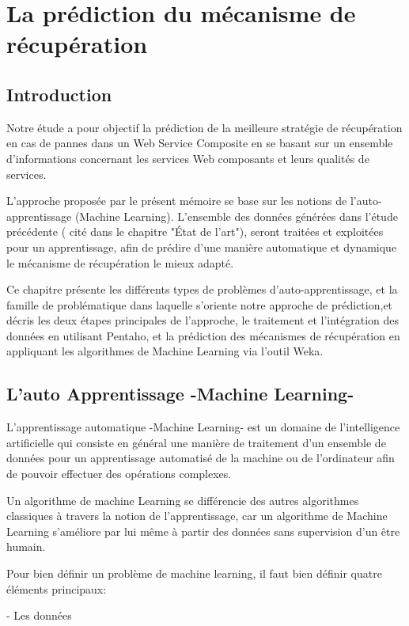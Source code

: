 \chapter{La prédiction du mécanisme de récupération}

\section{Introduction}
Notre étude a pour objectif la prédiction de la meilleure stratégie de récupération en cas de pannes dans un Web Service Composite en se basant sur un ensemble d'informations concernant les services Web composants et leurs qualités de services.

L'approche proposée par le présent mémoire se base sur les notions de l'auto-apprentissage (Machine Learning). L'ensemble des données générées dans l'étude précédente ( cité dans le chapitre "État de l'art"), seront traitées et exploitées pour un apprentissage, afin de prédire d'une manière automatique et dynamique le mécanisme de récupération le mieux adapté.

Ce chapitre présente les différents types de problèmes d'auto-apprentissage, et la famille de problématique dans laquelle s'oriente notre approche de prédiction,et décris les deux étapes principales de l'approche, le traitement et l'intégration des données en utilisant Pentaho, et la prédiction des mécanismes de récupération en appliquant les algorithmes de Machine Learning via l'outil Weka. 


\section{L'auto Apprentissage -Machine Learning- }

L'apprentissage automatique -Machine Learning- est un domaine de l'intelligence artificielle qui consiste en général une manière de traitement d'un ensemble de données pour un apprentissage automatisé de la machine ou de l'ordinateur afin de pouvoir effectuer des opérations complexes.

Un algorithme de machine Learning se différencie des autres algorithmes classiques à travers la notion de l'apprentissage, car un algorithme de Machine Learning s'améliore par lui même à partir des données sans supervision d'un être humain.

Pour bien définir un problème de machine learning, il faut bien définir quatre éléments principaux: 

- Les données

